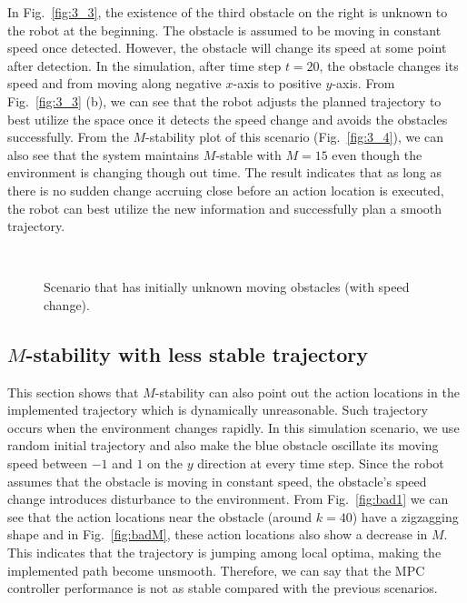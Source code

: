 \documentclass[letterpaper, 10 pt, conference]{ieeeconf}  %
\begin{document}
In Fig.~\ref{fig:3_3}, the existence of the third obstacle on the right is unknown to the robot at the beginning. The obstacle is assumed to be moving in constant speed once detected. However, the obstacle will change its speed at some point after detection. In the simulation, after time step $t=20$, the obstacle changes its speed and from moving along negative $x$-axis to positive $y$-axis. From Fig.~\ref{fig:3_3} (b), we can see that the robot adjusts the planned trajectory to best utilize the space once it detects the speed change and avoids the obstacles successfully. From the $M$-stability plot of this scenario (Fig.~\ref{fig:3_4}), we can also see that the system maintains $M$-stable with $M=15$ even though the environment is changing though out time. The result indicates that as long as there is no sudden change accruing close before an action location is executed, the robot can best utilize the new information and successfully plan a smooth trajectory.



\begin{figure}[t]
      \centering
      \\
      
      \caption{Scenario that has initially unknown moving obstacles (with speed change).}
      
\end{figure}



\subsection{$M$-stability with less stable trajectory}

This section shows that $M$-stability can also point out the action locations in the implemented trajectory which is dynamically unreasonable. Such trajectory occurs when the environment changes rapidly. In this simulation scenario, we use random initial trajectory and also make the blue obstacle oscillate its moving speed between $-1$ and $1$ on the $y$ direction at every time step. Since the robot assumes that the obstacle is moving in constant speed, the obstacle's speed change introduces disturbance to the environment.  From Fig.~\ref{fig:bad1} we can see that the action locations near the obstacle (around $k=40$) have a zigzagging shape and in Fig.~\ref{fig:badM}, these action locations also show a decrease in $M$. This indicates that the trajectory is jumping among local optima, making the implemented path become unsmooth. Therefore, we can say that the MPC controller performance is not as stable compared with the previous scenarios.
\end{document}

